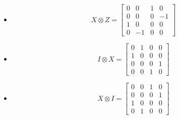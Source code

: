 \documentclass{homeworg}
\begin{document}
\exercise*
\begin{itemize}
\item
\[X\otimes Z=\begin{bmatrix}
0 & 0 & 1 & 0 \\
0 & 0 & 0 & -1 \\
1 & 0 & 0 & 0 \\
0 & -1 & 0 & 0\end{bmatrix}\]
\item
\[I\otimes X=\begin{bmatrix}
0 & 1 & 0 & 0 \\
1 & 0 & 0 & 0 \\
0 & 0 & 0 & 1 \\
0 & 0 & 1 & 0\end{bmatrix}\]
\item
\[X\otimes I=\begin{bmatrix}
0 & 0 & 1 & 0 \\
0 & 0 & 0 & 1 \\
1 & 0 & 0 & 0 \\
0 & 1 & 0 & 0\end{bmatrix}\]
\end{itemize}
\end{document}
